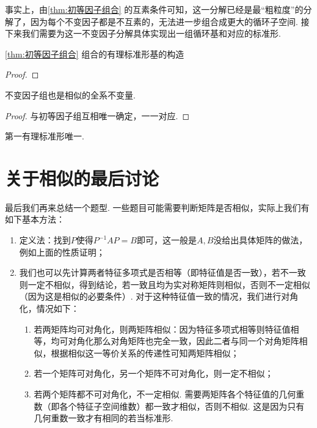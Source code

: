 事实上，由\autoref{thm:初等因子组合} 的互素条件可知，这一分解已经是最``粗粒度''的分解了，因为每个不变因子都是不互素的，无法进一步组合成更大的循环子空间. 接下来我们需要为这一不变因子分解具体实现出一组循环基和对应的标准形.

\begin{theorem}{}{}
    \autoref{thm:初等因子组合} 组合的有理标准形基的构造
\end{theorem}
\begin{proof}

\end{proof}

\begin{theorem}{}{}
    不变因子组也是相似的全系不变量.
\end{theorem}
\begin{proof}
    与初等因子组互相唯一确定，一一对应.
\end{proof}

\begin{corollary}{}{}
    第一有理标准形唯一.
\end{corollary}

\section{关于相似的最后讨论}

最后我们再来总结一个题型. 一些题目可能需要判断矩阵是否相似，实际上我们有如下基本方法：
\begin{enumerate}
    \item 定义法：找到$P$使得$P^{-1}AP=B$即可，这一般是$A,B$没给出具体矩阵的做法，例如上面的性质证明；

    \item 我们也可以先计算两者特征多项式是否相等（即特征值是否一致），若不一致则一定不相似，得到结论，若一致且均为实对称矩阵则相似，否则不一定相似（因为这是相似的必要条件）. 对于这种特征值一致的情况，我们进行对角化，情况如下：
          \begin{enumerate}
              \item 若两矩阵均可对角化，则两矩阵相似：因为特征多项式相等则特征值相等，均可对角化那么对角矩阵也完全一致，因此二者与同一个对角矩阵相似，根据相似这一等价关系的传递性可知两矩阵相似；

              \item 若一个矩阵可对角化，另一个矩阵不可对角化，则一定不相似；

              \item 若两个矩阵都不可对角化，不一定相似. 需要两矩阵各个特征值的几何重数（即各个特征子空间维数）都一致才相似，否则不相似. 这是因为只有几何重数一致才有相同的若当标准形.
          \end{enumerate}
\end{enumerate}

